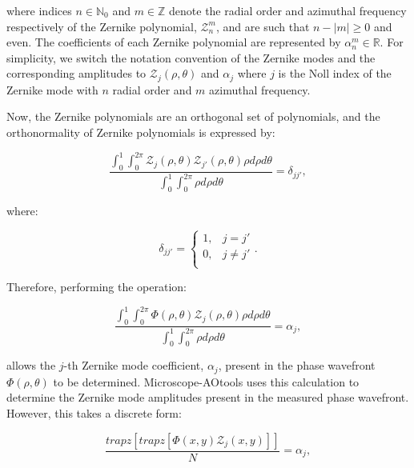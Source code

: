 where indices $n \in \mathbb{N}_{0}$ and $m \in \mathbb{Z}$ denote the radial order and azimuthal frequency respectively of the Zernike polynomial, $\mathcal{Z}^{m}_{n}$, and are such that $n - \left|m\right| \ge 0$ and even. The coefficients of each Zernike polynomial are represented by $\alpha^{m}_{n} \in \mathbb{R}$. For simplicity, we switch the notation convention of the Zernike modes and the corresponding amplitudes to $\mathcal{Z}_{j}\left(\rho,\theta\right)$ and $\alpha_{j}$ where $j$ is the Noll index of the Zernike mode with $n$ radial order and $m$ azimuthal frequency.

Now, the Zernike polynomials are an orthogonal set of polynomials, and the orthonormality of Zernike polynomials is expressed by\cite{lakshminarayanan2011zernike}:

\begin{equation}\label{eq:orthonormality}
\frac{\int_{0}^{1}\int_{0}^{2\pi}\mathcal{Z}_{j}\left(\rho,\theta\right)\mathcal{Z}_{j'}\left(\rho,\theta\right)\rho d\rho d\theta}{\int_{0}^{1}\int_{0}^{2\pi}\rho d\rho d\theta} = \delta_{jj'},
\end{equation}

where:

\begin{equation}\label{eq:delta_j}
\delta_{jj'} = 
\begin{cases}
1, & j = j'\\
0, & j \ne j'\\ 
\end{cases}.
\end{equation}

Therefore, performing the operation:

\begin{equation}\label{eq:zernike_amp_extraction}
\frac{\int_{0}^{1}\int_{0}^{2\pi}\Phi\left(\rho,\theta\right)\mathcal{Z}_{j}\left(\rho,\theta\right)\rho d\rho d\theta}{\int_{0}^{1}\int_{0}^{2\pi}\rho d\rho d\theta} = \alpha_{j},
\end{equation}

allows the $j$-th Zernike mode coefficient, $\alpha_{j}$, present in the 
phase wavefront $\Phi\left(\rho,\theta\right)$ to be determined. 
Microscope-AOtools uses this calculation to determine the Zernike mode 
amplitudes present in the measured phase wavefront. However, this takes a 
discrete form:

\begin{equation}\label{eq:zernike_amp_extraction_discrete}
\frac{trapz\left[trapz\left[\Phi\left(x,y\right)\mathcal{Z}_{j}\left(x,y\right)\right]\right]}{N} = \alpha_{j},
\end{equation}

